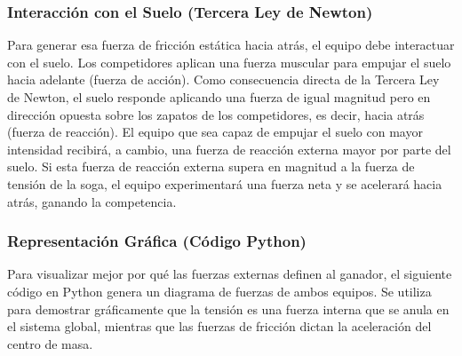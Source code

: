 \documentclass[12pt]{article}
\begin{document}
\subsubsection*{Interacción con el Suelo (Tercera Ley de Newton)}
Para generar esa fuerza de fricción estática hacia atrás, el equipo debe interactuar con el suelo. Los competidores aplican una fuerza muscular para empujar el suelo hacia adelante (fuerza de acción). Como consecuencia directa de la Tercera Ley de Newton, el suelo responde aplicando una fuerza de igual magnitud pero en dirección opuesta sobre los zapatos de los competidores, es decir, hacia atrás (fuerza de reacción). El equipo que sea capaz de empujar el suelo con mayor intensidad recibirá, a cambio, una fuerza de reacción externa mayor por parte del suelo. Si esta fuerza de reacción externa supera en magnitud a la fuerza de tensión de la soga, el equipo experimentará una fuerza neta y se acelerará hacia atrás, ganando la competencia.

\subsubsection*{Representación Gráfica (Código Python)}
Para visualizar mejor por qué las fuerzas externas definen al ganador, el siguiente código en Python genera un diagrama de fuerzas de ambos equipos. Se utiliza para demostrar gráficamente que la tensión es una fuerza interna que se anula en el sistema global, mientras que las fuerzas de fricción dictan la aceleración del centro de masa.
\end{document}
